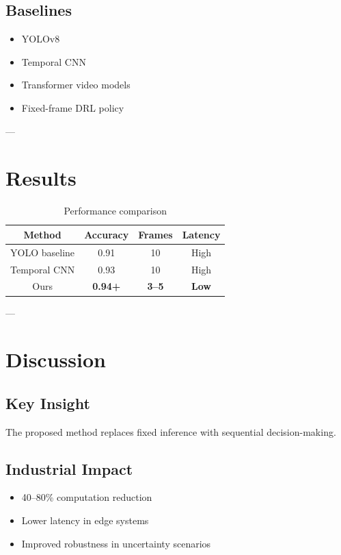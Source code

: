 \documentclass[journal]{IEEEtran}
\begin{document}
\subsection{Baselines}
\begin{itemize}
    \item YOLOv8
    \item Temporal CNN
    \item Transformer video models
    \item Fixed-frame DRL policy
\end{itemize}

---

\section{Results}

\begin{table}[h]
\centering
\begin{tabular}{|c|c|c|c|}
\hline
Method & Accuracy & Frames & Latency \\
\hline
YOLO baseline & 0.91 & 10 & High \\
Temporal CNN & 0.93 & 10 & High \\
Ours & \textbf{0.94+} & \textbf{3--5} & \textbf{Low} \\
\hline
\end{tabular}
\caption{Performance comparison}
\end{table}

---

\section{Discussion}

\subsection{Key Insight}
The proposed method replaces fixed inference with sequential decision-making.

\subsection{Industrial Impact}
\begin{itemize}
    \item 40--80\% computation reduction
    \item Lower latency in edge systems
    \item Improved robustness in uncertainty scenarios
\end{itemize}
\end{document}
